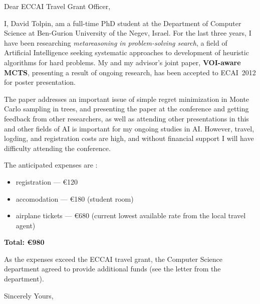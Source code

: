\documentclass[11pt]{letter}
\begin{document}
\begin{letter}{}
\opening{Dear ECCAI Travel Grant Officer,}

I, David Tolpin, am a full-time PhD student at the Department of
Computer Science at Ben-Gurion University of the Negev, Israel. For the last
three years, I have been researching {\it metareasoning in
  problem-solving search}, a field of Artificial Intelligence seeking
systematic approaches to development of heuristic algorithms for hard
problems. My and my advisor's joint paper, {\bf VOI-aware MCTS},
presenting a result of ongoing research, has been accepted to
ECAI~2012 for poster presentation.

The paper addresses an important issue of simple regret minimization
in Monte Carlo sampling in trees, and presenting the paper at the
conference and getting feedback from other researchers,
as well as attending other presentations in this and other fields of
AI is important for my ongoing studies in AI. However, travel,
logding, and registration costs are high, and without financial 
support I will have difficulty attending the conference.

The anticipated expenses are :

\begin{itemize}
\item registration --- \euro{120}
\item accomodation --- \euro{180} (student room)
\item airplane tickets --- \euro{680} (current lowest available rate
  from the local travel agent)
\end{itemize}

{\bf Total: \euro{980}}

As the expenses exceed the ECCAI travel grant, the Computer Science
department agreed to provide additional funds (see the letter from the 
department).

\closing{Sincerely Yours,}

\end{letter}
\end{document}
